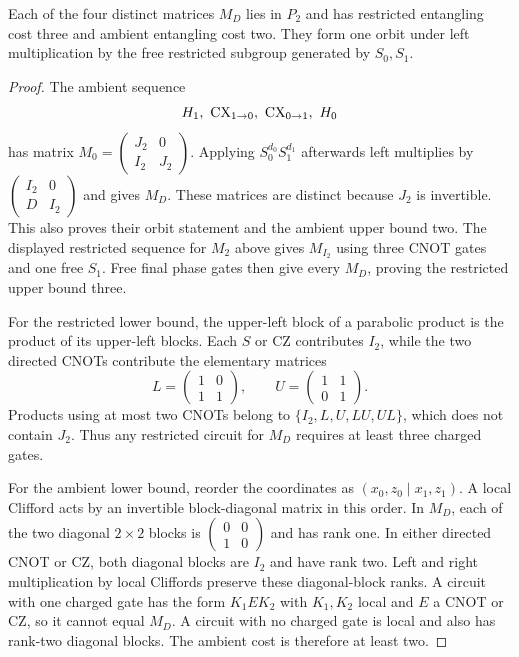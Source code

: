 \begin{theorem}\label{thm:clifford-two-analytic}
Each of the four distinct matrices $M_D$ lies in $P_2$ and has restricted entangling cost three and ambient entangling cost two.  They form one orbit under left multiplication by the free restricted subgroup generated by $S_0,S_1$.
\end{theorem}
\begin{proof}
The ambient sequence
\[
H_1,\ \operatorname{CX}_{1\to0},\ \operatorname{CX}_{0\to1},\ H_0
\]
has matrix $M_0=\left(\begin{smallmatrix}J_2&0\\I_2&J_2\end{smallmatrix}\right)$.  Applying $S_0^{d_0}S_1^{d_1}$ afterwards left multiplies by $\left(\begin{smallmatrix}I_2&0\\D&I_2\end{smallmatrix}\right)$ and gives $M_D$.  These matrices are distinct because $J_2$ is invertible.  This also proves their orbit statement and the ambient upper bound two.  The displayed restricted sequence for $M_2$ above gives $M_{I_2}$ using three CNOT gates and one free $S_1$.  Free final phase gates then give every $M_D$, proving the restricted upper bound three.

For the restricted lower bound, the upper-left block of a parabolic product is the product of its upper-left blocks.  Each $S$ or CZ contributes $I_2$, while the two directed CNOTs contribute the elementary matrices
\[
L=\begin{pmatrix}1&0\\1&1\end{pmatrix},
\qquad U=\begin{pmatrix}1&1\\0&1\end{pmatrix}.
\]
Products using at most two CNOTs belong to $\{I_2,L,U,LU,UL\}$, which does not contain $J_2$.  Thus any restricted circuit for $M_D$ requires at least three charged gates.

For the ambient lower bound, reorder the coordinates as $(x_0,z_0\mid x_1,z_1)$.  A local Clifford acts by an invertible block-diagonal matrix in this order.  In $M_D$, each of the two diagonal $2\times2$ blocks is $\left(\begin{smallmatrix}0&0\\1&0\end{smallmatrix}\right)$ and has rank one.  In either directed CNOT or CZ, both diagonal blocks are $I_2$ and have rank two.  Left and right multiplication by local Cliffords preserve these diagonal-block ranks.  A circuit with one charged gate has the form $K_1 E K_2$ with $K_1,K_2$ local and $E$ a CNOT or CZ, so it cannot equal $M_D$.  A circuit with no charged gate is local and also has rank-two diagonal blocks.  The ambient cost is therefore at least two.
\end{proof}

